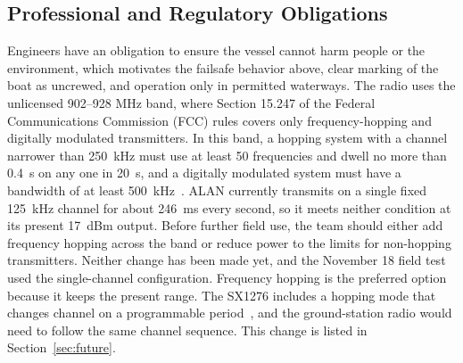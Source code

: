 \subsection{Professional and Regulatory Obligations}
Engineers have an obligation to ensure the vessel cannot harm people or the
environment, which motivates the failsafe behavior above, clear marking of
the boat as uncrewed, and operation only in permitted waterways. The radio
uses the unlicensed 902--928 MHz band, where Section 15.247 of the Federal Communications Commission (FCC) rules
covers only frequency-hopping and digitally modulated transmitters. In this
band, a hopping system with a channel narrower than \SI{250}{\kilo\hertz}
must use at least 50 frequencies and dwell no more than \SI{0.4}{\second} on
any one in \SI{20}{\second}, and a digitally modulated system must have a
bandwidth of at least \SI{500}{\kilo\hertz}~\cite{cfr15247}. ALAN currently
transmits on a single fixed \SI{125}{\kilo\hertz} channel for about
\SI{246}{\milli\second} every second, so it meets neither condition at its
present \SI{17}{dBm} output. Before further field use, the team should either
add frequency hopping across the band or reduce power to the limits for
non-hopping transmitters. Neither change has been made yet,
and the November 18 field test used the single-channel configuration.
Frequency hopping is the preferred option because it keeps the present range.
The SX1276 includes a hopping mode that changes channel on a programmable
period~\cite{sx1276}, and the ground-station radio would need to follow the
same channel sequence. This change is listed in Section~\ref{sec:future}.